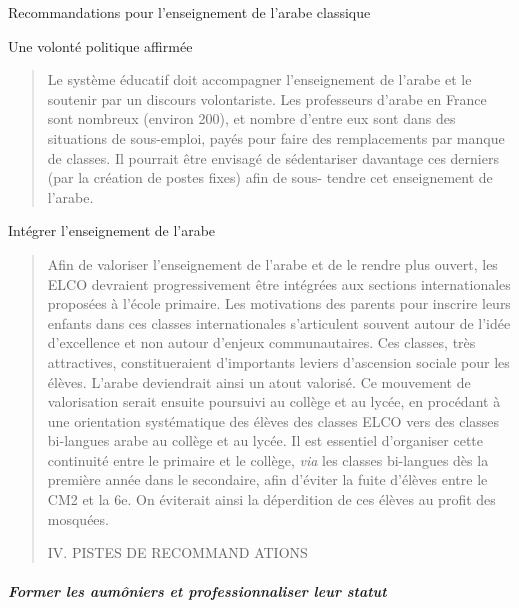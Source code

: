 Recommandations pour l'enseignement de l'arabe classique

Une volonté politique affirmée

\begin{quote}
Le système éducatif doit accompagner l'enseignement de l'arabe et le
soutenir par un discours volontariste. Les professeurs d'arabe en France
sont nombreux (environ 200), et nombre d'entre eux sont dans des
situations de sous-emploi, payés pour faire des remplacements par manque
de classes. Il pourrait être envisagé de sédentariser davantage ces
derniers (par la création de postes fixes) afin de sous- tendre cet
enseignement de l'arabe.
\end{quote}

Intégrer l'enseignement de l'arabe

\begin{quote}
Afin de valoriser l'enseignement de l'arabe et de le rendre plus ouvert,
les ELCO devraient progressivement être intégrées aux sections
internationales proposées à l'école primaire. Les motivations des
parents pour inscrire leurs enfants dans ces classes internationales
s'articulent souvent autour de l'idée d'excellence et non autour
d'enjeux communautaires. Ces classes, très attractives, constitueraient
d'importants leviers d'ascension sociale pour les élèves. L'arabe
deviendrait ainsi un atout valorisé. Ce mouvement de valorisation serait
ensuite poursuivi au collège et au lycée, en procédant à une orientation
systématique des élèves des classes ELCO vers des classes bi-langues
arabe au collège et au lycée. Il est essentiel d'organiser cette
continuité entre le primaire et le collège, \emph{via} les classes
bi-langues dès la première année dans le secondaire, afin d'éviter la
fuite d'élèves entre le CM2 et la 6e. On éviterait ainsi la déperdition
de ces élèves au profit des mosquées.

IV. PISTES DE RECOMMAND ATIONS
\end{quote}

\hypertarget{former-les-aumuxf4niers-et-professionnaliser-leur-statut}{%
\subparagraph{Former les aumôniers et professionnaliser leur
statut}\label{former-les-aumuxf4niers-et-professionnaliser-leur-statut}}

